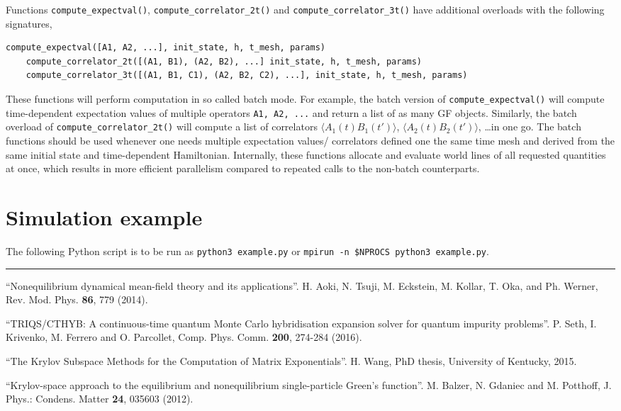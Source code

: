 \documentclass[]{article}
\newcommand{\aver}[1]{\ensuremath{\langle#1\rangle}}
\begin{document}
Functions \texttt{compute\_expectval()}, \texttt{compute\_correlator\_2t()} and \texttt{compute\_correlator\_3t()} have additional overloads with the following signatures,
\begin{lstlisting}[language=Python]
    compute_expectval([A1, A2, ...], init_state, h, t_mesh, params)
    compute_correlator_2t([(A1, B1), (A2, B2), ...] init_state, h, t_mesh, params)
    compute_correlator_3t([(A1, B1, C1), (A2, B2, C2), ...], init_state, h, t_mesh, params)
\end{lstlisting}
These functions will perform computation in so called batch mode. For example, the batch version of \texttt{compute\_expectval()} will compute time-dependent expectation values of multiple operators \texttt{A1, A2, ...} and return a list of as many GF objects. Similarly, the batch overload of \texttt{compute\_correlator\_2t()} will compute a list of correlators $\aver{A_1(t) B_1(t')}$, $\aver{A_2(t) B_2(t')}$, \ldots in one go. The batch functions should be used whenever one needs multiple expectation values/ correlators defined one the same time mesh and derived from the same initial state and time-dependent Hamiltonian. Internally, these functions allocate and evaluate world lines of all requested quantities at once, which results in more efficient parallelism compared to repeated calls to the non-batch counterparts.

\section{\label{sec:example}Simulation example}

The following Python script is to be run as \texttt{python3 example.py} or
\texttt{mpirun -n \$NPROCS python3 example.py}.

\hrule



\begin{thebibliography}{9}

``Nonequilibrium dynamical mean-field theory and its applications''.
H. Aoki, N. Tsuji, M. Eckstein, M. Kollar, T. Oka, and Ph. Werner,
Rev. Mod. Phys. {\bf 86}, 779 (2014).

``TRIQS/CTHYB: A continuous-time quantum Monte Carlo hybridisation
expansion solver for quantum impurity problems''.
P. Seth, I. Krivenko, M. Ferrero and O. Parcollet,
Comp. Phys. Comm. {\bf 200}, 274-284 (2016).

``The Krylov Subspace Methods for the Computation of Matrix Exponentials''.
H. Wang,
PhD thesis, University of Kentucky, 2015.

``Krylov-space approach to the equilibrium and nonequilibrium
single-particle Green's function''.
M. Balzer, N. Gdaniec and M. Potthoff,
J. Phys.: Condens. Matter {\bf 24}, 035603 (2012).

\end{thebibliography}
\end{document}
